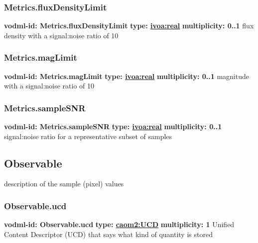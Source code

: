     \subsubsection{Metrics.fluxDensityLimit}
      \textbf{vodml-id: Metrics.fluxDensityLimit} \newline
      \textbf{type: \hyperref[sect:ivoa]{ivoa:real}} \newline
      \textbf{multiplicity: 0..1} \newline
      flux density with a signal:noise ratio of 10

    \subsubsection{Metrics.magLimit}
      \textbf{vodml-id: Metrics.magLimit} \newline
      \textbf{type: \hyperref[sect:ivoa]{ivoa:real}} \newline
      \textbf{multiplicity: 0..1} \newline
      magnitude with a signal:noise ratio of 10

    \subsubsection{Metrics.sampleSNR}
      \textbf{vodml-id: Metrics.sampleSNR} \newline
      \textbf{type: \hyperref[sect:ivoa]{ivoa:real}} \newline
      \textbf{multiplicity: 0..1} \newline
      signal:noise ratio for a representative subset of samples

  \subsection{Observable}
  \label{sect:Observable}
    description of the sample (pixel) values

    \subsubsection{Observable.ucd}
      \textbf{vodml-id: Observable.ucd} \newline
      \textbf{type: \hyperref[sect:UCD]{caom2:UCD}} \newline
      \textbf{multiplicity: 1} \newline
      Unified Content Descriptor (UCD) that says what kind of quantity is stored

